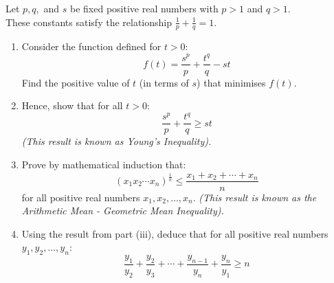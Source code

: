 \begin{problem}


Let $p, q,$ and $s$ be fixed positive real numbers with $p > 1$ and $q > 1$. \\
These constants satisfy the relationship $\frac{1}{p} + \frac{1}{q} = 1$.

\begin{enumerate}
    \item[(i)] Consider the function defined for $t > 0$:
    \[ f(t) = \frac{s^p}{p} + \frac{t^q}{q} - st \]
    Find the positive value of $t$ (in terms of $s$) that minimises $f(t)$.

    \item[(ii)] Hence, show that for all $t > 0$:
    \[ \frac{s^p}{p} + \frac{t^q}{q} \ge st \]
    \textit{(This result is known as Young's Inequality).}

    \item[(iii)] Prove by mathematical induction that:
    \[ (x_1 x_2 \cdots x_n)^{\frac{1}{n}} \le \frac{x_1 + x_2 + \cdots + x_n}{n} \]
    for all positive real numbers $x_1, x_2, \dots, x_n$.
    \textit{(This result is known as the Arithmetic Mean - Geometric Mean Inequality).}

    \item[(iv)] Using the result from part (iii), deduce that for all positive real numbers $y_1, y_2, \dots, y_n$:
    \[ \frac{y_1}{y_2} + \frac{y_2}{y_3} + \cdots + \frac{y_{n-1}}{y_n} + \frac{y_n}{y_1} \ge n \]
\end{enumerate}


\end{problem}

